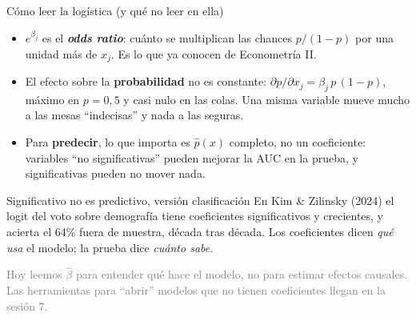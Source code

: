 \documentclass{beamer}
\newcommand{\1}{\mathbb{I}}
\begin{document}
\begin{frame}{Cómo leer la logística (y qué no leer en ella)}
\small
\begin{itemize}\itemsep5pt
  \item $e^{\beta_j}$ es el \textbf{\emph{odds ratio}}: cuánto se multiplican las chances $p/(1-p)$ por una unidad más de $x_j$. Es lo que ya conocen de Econometría II. \pause
  \item El efecto sobre la \textbf{probabilidad} no es constante: $\partial p / \partial x_j = \beta_j\, p\,(1-p)$, máximo en $p = 0{,}5$ y casi nulo en las colas. Una misma variable mueve mucho a las mesas ``indecisas'' y nada a las seguras. \pause
  \item Para \textbf{predecir}, lo que importa es $\hat{p}(x)$ completo, no un coeficiente: variables ``no significativas'' pueden mejorar la AUC en la prueba, y significativas pueden no mover nada. \pause
\end{itemize}
\vspace{0.1cm}
\begin{block}{Significativo no es predictivo, versión clasificación}
En Kim \& Zilinsky (2024) el logit del voto sobre demografía tiene coeficientes significativos y crecientes, y acierta el 64\% fuera de muestra, década tras década. Los coeficientes dicen \emph{qué usa} el modelo; la prueba dice \emph{cuánto sabe}.
\end{block}
\pause
\vspace{0.1cm}
\textcolor{gray}{Hoy leemos $\hat{\beta}$ para entender qué hace el modelo, no para estimar efectos causales. Las herramientas para ``abrir'' modelos que no tienen coeficientes llegan en la sesión 7.}
\end{frame}
\end{document}
